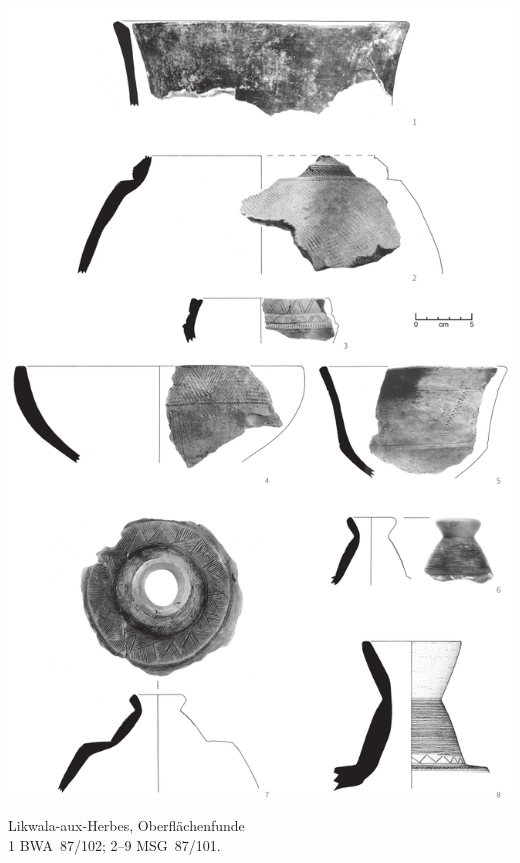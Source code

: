 \begin{pl}[H]
	\includegraphics{plt/Taf84.pdf}
	\vspace{.75em}\caption{Likwala-aux-Herbes, Oberflächenfunde \\ 1 BWA~87/102; 2--9 MSG~87/101.}
	\label{pl:84}
\end{pl}

